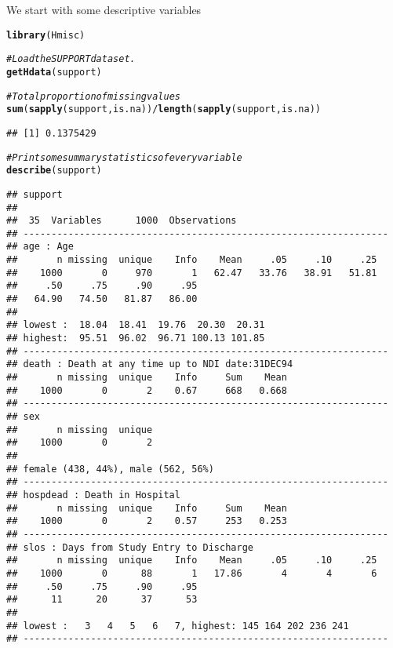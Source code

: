 \documentclass[headinclude=true, headsepline=true, DIV14]{scrartcl}\usepackage[]{graphicx}\usepackage[]{color}
\makeatletter
\newcommand{\hlcom}[1]{\textcolor[rgb]{0.678,0.584,0.686}{\textit{#1}}}%
\newcommand{\hlopt}[1]{\textcolor[rgb]{0,0,0}{#1}}%
\newcommand{\hlstd}[1]{\textcolor[rgb]{0.345,0.345,0.345}{#1}}%
\newcommand{\hlkwd}[1]{\textcolor[rgb]{0.737,0.353,0.396}{\textbf{#1}}}%
\newenvironment{kframe}{%
 \def\at@end@of@kframe{}%
 \ifinner\ifhmode%
  \def\at@end@of@kframe{\end{minipage}}%
  \begin{minipage}{\columnwidth}%
 \fi\fi%
 \def\FrameCommand##1{\hskip\@totalleftmargin \hskip-\fboxsep
 \colorbox{shadecolor}{##1}\hskip-\fboxsep
     \hskip-\linewidth \hskip-\@totalleftmargin \hskip\columnwidth}%
 \MakeFramed {\advance\hsize-\width
   \@totalleftmargin\z@ \linewidth\hsize
   \@setminipage}}%
 {\par\unskip\endMakeFramed%
 \at@end@of@kframe}
\newenvironment{knitrout}{}{} %
\makeatother
\begin{document}
We start with some descriptive variables

\begin{knitrout}
\color{fgcolor}\begin{kframe}
\begin{alltt}
\hlkwd{library}\hlstd{(Hmisc)}

\hlcom{# Load the SUPPORT data set.}
\hlkwd{getHdata}\hlstd{(support)}

\hlcom{# Total proportion of missing values}
\hlkwd{sum}\hlstd{(}\hlkwd{sapply}\hlstd{(support, is.na))}\hlopt{/}\hlkwd{length}\hlstd{(}\hlkwd{sapply}\hlstd{(support, is.na))}
\end{alltt}
\begin{verbatim}
## [1] 0.1375429
\end{verbatim}
\begin{alltt}
\hlcom{# Print some summary statistics of every variable}
\hlkwd{describe}\hlstd{(support)}
\end{alltt}
\begin{verbatim}
## support 
## 
##  35  Variables      1000  Observations
## -----------------------------------------------------------------
## age : Age 
##       n missing  unique    Info    Mean     .05     .10     .25 
##    1000       0     970       1   62.47   33.76   38.91   51.81 
##     .50     .75     .90     .95 
##   64.90   74.50   81.87   86.00 
## 
## lowest :  18.04  18.41  19.76  20.30  20.31
## highest:  95.51  96.02  96.71 100.13 101.85 
## -----------------------------------------------------------------
## death : Death at any time up to NDI date:31DEC94 
##       n missing  unique    Info     Sum    Mean 
##    1000       0       2    0.67     668   0.668 
## -----------------------------------------------------------------
## sex 
##       n missing  unique 
##    1000       0       2 
## 
## female (438, 44%), male (562, 56%) 
## -----------------------------------------------------------------
## hospdead : Death in Hospital 
##       n missing  unique    Info     Sum    Mean 
##    1000       0       2    0.57     253   0.253 
## -----------------------------------------------------------------
## slos : Days from Study Entry to Discharge 
##       n missing  unique    Info    Mean     .05     .10     .25 
##    1000       0      88       1   17.86       4       4       6 
##     .50     .75     .90     .95 
##      11      20      37      53 
## 
## lowest :   3   4   5   6   7, highest: 145 164 202 236 241 
## -----------------------------------------------------------------

\end{verbatim}
\end{kframe}
\end{knitrout}
\end{document}
